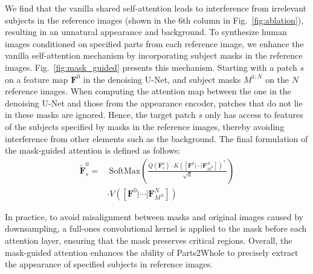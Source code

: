 We find that the vanilla shared self-attention leads to interference from irrelevant subjects in the reference images (shown in the 6th column in Fig.~\ref{fig:ablation}), resulting in an unnatural appearance and background. To synthesize human images conditioned on specified parts from each reference image, we enhance the vanilla self-attention mechanism by incorporating subject masks in the reference images. Fig.~\ref{fig:mask_guided} presents this mechanism. Starting with a patch $s$ on a feature map $\bm{F}^{0}$ in the denoising U-Net, and subject masks $M^{1:N}$ on the $N$ reference images. When computing the attention map between the one in the denoising U-Net and those from the appearance encoder, patches that do not lie in these masks are ignored. Hence, the target patch $s$ only has access to features of the subjects specified by masks in the reference images, thereby avoiding interference from other elements such as the background. The final formulation of the mask-guided attention is defined as follows:
\begin{equation}
\begin{split}
    \tilde{\bm{F}}_{s}^{0} =&\ \text{SoftMax}\left(
    \frac{
    Q(\bm{F}_s^0)\cdot K([\bm{F}^{0}|\cdots|\bm{F}^{N}_{M^{N}}])^{\top}
    }{
    \sqrt{d}
    }\right)\\
    & \cdot V([\bm{F}^{0}|\cdots|\bm{F}^{N}_{M^{N}}])
    \label{eq:mask_guided_self_attn}
\end{split}
\end{equation}

In practice, to avoid misalignment between masks and original images caused by downsampling, a full-ones convolutional kernel is applied to the mask before each attention layer, ensuring that the mask preserves critical regions. Overall, the mask-guided attention enhances the ability of Parts2Whole to precisely extract the appearance of specified subjects in reference images.
